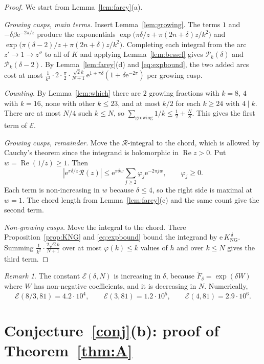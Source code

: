 \documentclass[11pt]{amsart}
\theoremstyle{remark}
\newtheorem{remark}[theorem]{Remark}
\theoremstyle{definition}
\newcommand{\cP}{\mathcal P}
\newcommand{\cE}{\mathcal E}
\newcommand{\cR}{\mathcal R}
\newcommand{\Rea}{\operatorname{Re}}
\newcommand{\e}{\mathrm e}
\newcommand{\KNG}{K_{\mathrm{NG}}}
\begin{document}
\begin{proof}
We start from Lemma~\ref{lem:farey}(a).

\emph{Growing cusps, main terms.} Insert Lemma~\ref{lem:growing}. The terms $1$ and $-\delta\beta\e^{-2\pi/z}$ produce the exponentials $\exp\big(\pi\delta/z+\pi(2n+\delta)z/k^2\big)$ and $\exp\big(\pi(\delta-2)/z+\pi(2n+\delta)z/k^2\big)$. Completing each integral from the arc $z'\to1\to z''$ to all of $K$ and applying Lemma~\ref{lem:bessel} gives $\cP_k(\delta)$ and $\cP_k(\delta-2)$. By Lemma~\ref{lem:farey}(d) and \eqref{eq:expbound}, the two added arcs cost at most $\frac1{k^2}\cdot2\cdot\frac\pi2\cdot\frac{\sqrt2k}{N+1}\,\e^{1+\pi\delta}(1+\delta\e^{-2\pi})$ per growing cusp.

\emph{Counting.} By Lemma~\ref{lem:which} there are $2$ growing fractions with $k=8$, $4$ with $k=16$, none with other $k\le23$, and at most $k/2$ for each $k\ge24$ with $4\mid k$. There are at most $N/4$ such $k\le N$, so $\sum_{\text{growing}}1/k\le\frac12+\frac N8$. This gives the first term of $\cE$.

\emph{Growing cusps, remainder.} Move the $\cR$-integral to the chord, which is allowed by Cauchy's theorem since the integrand is holomorphic in $\Rea z>0$. Put $w=\Rea(1/z)\ge1$. Then
\[
|\e^{\pi\delta/z}\cR(z)|\le\e^{\pi\delta w}\sum_{j\ge2}\varphi_j\e^{-2\pi jw},\qquad \varphi_j\ge0 .
\]
Each term is non-increasing in $w$ because $\delta\le4$, so the right side is maximal at $w=1$. The chord length from Lemma~\ref{lem:farey}(c) and the same count give the second term.

\emph{Non-growing cusps.} Move the integral to the chord. There Proposition~\ref{prop:KNG} and \eqref{eq:expbound} bound the integrand by $\e\,\KNG^{\,\delta}$. Summing $\frac1{k^2}\cdot\frac{2\sqrt2k}{N+1}$ over at most $\varphi(k)\le k$ values of $h$ and over $k\le N$ gives the third term.
\end{proof}

\begin{remark}\label{rem:E}
The constant $\cE(\delta,N)$ is increasing in $\delta$, because $\widetilde F_\delta=\exp(\delta W)$ where $W$ has non-negative coefficients, and it is decreasing in $N$. Numerically,
\[
\cE(8/3,81)=4.2\cdot10^4,\qquad \cE(3,81)=1.2\cdot10^5,\qquad \cE(4,81)=2.9\cdot10^6 .
\]
\end{remark}

\section{Conjecture~\ref{conj}(b): proof of Theorem~\ref{thm:A}}\label{sec:A}
\end{document}
